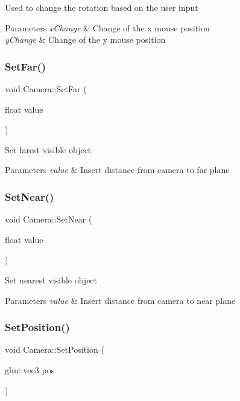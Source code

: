 Used to change the rotation based on the user input 
\begin{DoxyParams}{Parameters}
{\em x\+Change} & Change of the x mouse position \\
\hline
{\em y\+Change} & Change of the y mouse position \\
\hline
\end{DoxyParams}
\mbox{\label{class_camera_ae259567c7a03f64982178848e5c2dc97}} 
\subsubsection{\texorpdfstring{SetFar()}{SetFar()}}
{\footnotesize\ttfamily void Camera\+::\+Set\+Far (\begin{DoxyParamCaption}\item[{float}]{value }\end{DoxyParamCaption})}

Set farest visible object 
\begin{DoxyParams}{Parameters}
{\em value} & Insert distance from camera to far plane \\
\hline
\end{DoxyParams}
\mbox{\label{class_camera_a26734bdbf1daea7a931d87ab41718e23}} 
\subsubsection{\texorpdfstring{SetNear()}{SetNear()}}
{\footnotesize\ttfamily void Camera\+::\+Set\+Near (\begin{DoxyParamCaption}\item[{float}]{value }\end{DoxyParamCaption})}

Set nearest visible object 
\begin{DoxyParams}{Parameters}
{\em value} & Insert distance from camera to near plane \\
\hline
\end{DoxyParams}
\mbox{\label{class_camera_abe0e64d3ac0eedeedc821e0f4a1e0367}} 
\subsubsection{\texorpdfstring{SetPosition()}{SetPosition()}\hspace{0.1cm}{\footnotesize\ttfamily [1/2]}}
{\footnotesize\ttfamily void Camera\+::\+Set\+Position (\begin{DoxyParamCaption}\item[{glm\+::vec3}]{pos }\end{DoxyParamCaption})}

